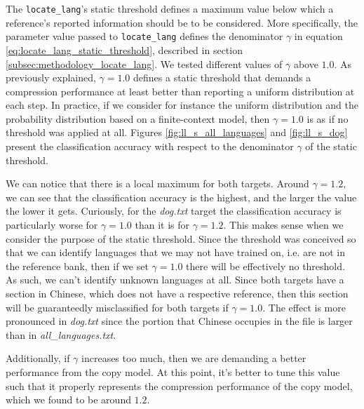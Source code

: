 \documentclass{article}
\begin{document}
The \texttt{locate_lang}'s static threshold defines a maximum value below which a reference's reported information should be to be considered.
More specifically, the parameter value passed to \texttt{locate_lang} defines the denominator $\gamma$ in equation \ref{eq:locate_lang_static_threshold}, described in section \ref{subsec:methodology_locate_lang}.
We tested different values of $\gamma$ above $1.0$.
As previously explained, $\gamma = 1.0$ defines a static threshold that demands a compression performance at least better than reporting a uniform distribution at each step.
In practice, if we consider for instance the uniform distribution and the probability distribution based on a finite-context model, then $\gamma = 1.0$ is as if no threshold was applied at all.
Figures \ref{fig:ll_s_all_languages} and \ref{fig:ll_s_dog} present the classification accuracy with respect to the denominator $\gamma$ of the static threshold.

We can notice that there is a local maximum for both targets.
Around $\gamma = 1.2$, we can see that the classification accuracy is the highest, and the larger the value the lower it gets.
Curiously, for the \textit{dog.txt} target the classification accuracy is particularly worse for $\gamma = 1.0$ than it is for $\gamma = 1.2$.
This makes sense when we consider the purpose of the static threshold.
Since the threshold was conceived so that we can identify languages that we may not have trained on, i.e. are not in the reference bank, then if we set $\gamma = 1.0$ there will be effectively no threshold.
As such, we can't identify unknown languages at all.
Since both targets have a section in Chinese, which does not have a respective reference, then this section will be guaranteedly misclassified for both targets if $\gamma = 1.0$.
The effect is more pronounced in \textit{dog.txt} since the portion that Chinese occupies in the file is larger than in \textit{all\_languages.txt}.

Additionally, if $\gamma$ increases too much, then we are demanding a better performance from the copy model.
At this point, it's better to tune this value such that it properly represents the compression performance of the copy model, which we found to be around $1.2$.
\end{document}
